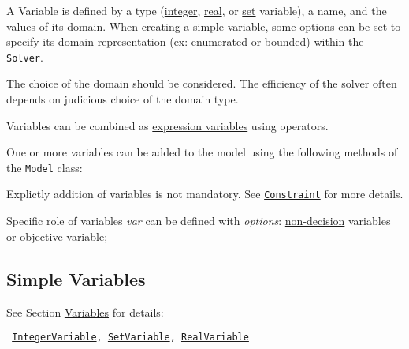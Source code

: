A Variable is defined by a type (\hyperlink{integervariable}{integer}, \hyperlink{realvariable}{real}, or \hyperlink{setvariable}{set} variable), a name, and the values of its domain. When creating a simple variable, some options can be set to specify its domain representation (ex: enumerated or bounded) within the {\tt Solver}.
\begin{note}
The choice of the domain should be considered. The efficiency of the solver often depends on judicious choice of the domain type.
\end{note}
Variables can be combined as \hyperlink{model:expressionvariables}{expression variables} using operators.

One or more variables can be added to the model using the following methods of the \texttt{Model} class:


\begin{note}
Explictly addition of variables is not mandatory. See \hyperlink{model:constraints}{\tt Constraint} for more details.
\end{note}

Specific role of variables \emph{var} can be defined with \emph{options}:  \hyperlink{model:decisionvariables}{non-decision} variables or  \hyperlink{model:objectivevariable}{objective} variable;



\subsection{Simple Variables}\label{model:simplevariables}\hypertarget{model:simplevariables}{}
See Section \hyperlink{ch:vars}{Variables} for details:

\begin{notedef}\tt
\hyperlink{integervariable}{IntegerVariable}, \hyperlink{setvariable}{SetVariable}, \hyperlink{realvariable}{RealVariable}
\end{notedef}


